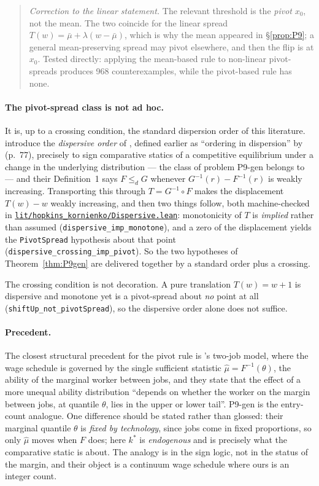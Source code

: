 \documentclass[11pt]{article}
\newcommand{\file}[1]{\href{run:#1}{\texttt{#1}}}
\begin{document}
\begin{quotation}
\noindent\textit{Correction to the linear statement.} The relevant
threshold is the \emph{pivot} $x_0$, not the mean. The two coincide for
the linear spread $T(w)=\bar\mu+\lambda(w-\bar\mu)$, which is why the mean
appeared in \S\ref{prop:P9}; a general mean-preserving spread may pivot
elsewhere, and then the flip is at $x_0$. Tested directly: applying the
mean-based rule to non-linear pivot-spreads produces 968 counterexamples,
while the pivot-based rule has none.
\end{quotation}

\paragraph{The pivot-spread class is not ad hoc.} It is, up to a crossing
condition, the standard dispersion order of this literature.
\citet{HopkinsKornienko2009} introduce the \emph{dispersive order} of
\citet{Shaked1982}, defined earlier as ``ordering in dispersion'' by
\citet{LewisThompson1981} (p.~77), precisely to sign comparative statics of a competitive
equilibrium under a change in the underlying distribution --- the class of
problem P9-gen belongs to --- and their Definition~1 says $F \leq_d G$ whenever
$G^{-1}(r) - F^{-1}(r)$ is weakly increasing. Transporting this through
$T = G^{-1}\circ F$ makes the displacement $T(w) - w$ weakly increasing, and
then two things follow, both machine-checked in
\file{lit/hopkins\_kornienko/Dispersive.lean}: monotonicity of $T$ is
\emph{implied} rather than assumed (\texttt{dispersive\_imp\_monotone}), and a
zero of the displacement yields the \texttt{PivotSpread} hypothesis about that
point (\texttt{dispersive\_crossing\_imp\_pivot}). So the two hypotheses of
Theorem~\ref{thm:P9gen} are delivered together by a standard order plus a
crossing.

The crossing condition is not decoration. A pure translation $T(w) = w+1$ is
dispersive and monotone yet is a pivot-spread about \emph{no} point at all
(\texttt{shiftUp\_not\_pivotSpread}), so the dispersive order alone does not
suffice.

\paragraph{Precedent.} The closest structural precedent for the pivot rule is
\citet{CostrellLoury2004}'s two-job model, where the wage schedule is governed
by the single sufficient statistic $\hat\mu = F^{-1}(\theta)$, the ability of
the marginal worker between jobs, and they state that the effect of a more
unequal ability distribution ``depends on whether the worker on the margin
between jobs, at quantile $\theta$, lies in the upper or lower tail''. P9-gen
is the entry-count analogue. One difference should be stated rather than
glossed: their marginal quantile $\theta$ is \emph{fixed by technology}, since
jobs come in fixed proportions, so only $\hat\mu$ moves when $F$ does; here
$k^*$ is \emph{endogenous} and is precisely what the comparative static is
about. The analogy is in the sign logic, not in the status of the margin, and
their object is a continuum wage schedule where ours is an integer count.
\end{document}
